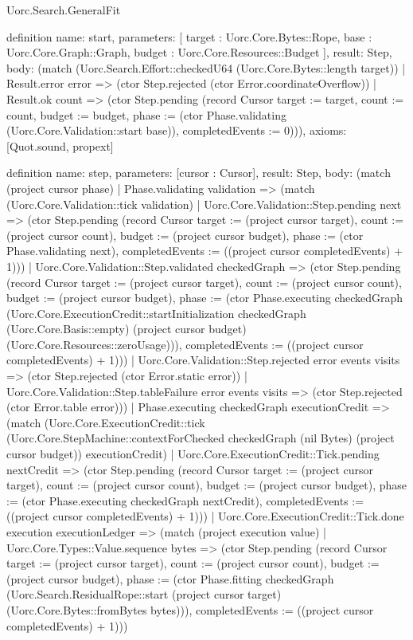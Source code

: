 \begin{lexlean}{Uorc.Search.GeneralFit}
\begin{semanticmodule}
definition{
  name: start,
  parameters: [
    target : Uorc.Core.Bytes::Rope,
    base : Uorc.Core.Graph::Graph,
    budget : Uorc.Core.Resources::Budget
  ],
  result: Step,
  body: (match (Uorc.Search.Effort::checkedU64 (Uorc.Core.Bytes::length target))
    | Result.error error => (ctor Step.rejected (ctor Error.coordinateOverflow))
    | Result.ok count => (ctor Step.pending (record Cursor {target := target, count := count, budget := budget, phase := (ctor Phase.validating (Uorc.Core.Validation::start base)), completedEvents := 0}))),
  axioms: [Quot.sound, propext]
}

definition{
  name: step,
  parameters: [cursor : Cursor],
  result: Step,
  body: (match (project cursor phase)
    | Phase.validating validation => (match (Uorc.Core.Validation::tick validation)
      | Uorc.Core.Validation::Step.pending next => (ctor Step.pending (record Cursor {target := (project cursor target), count := (project cursor count), budget := (project cursor budget), phase := (ctor Phase.validating next), completedEvents := ((project cursor completedEvents) + 1)}))
      | Uorc.Core.Validation::Step.validated checkedGraph => (ctor Step.pending (record Cursor {target := (project cursor target), count := (project cursor count), budget := (project cursor budget), phase := (ctor Phase.executing checkedGraph (Uorc.Core.ExecutionCredit::startInitialization checkedGraph (Uorc.Core.Basis::empty) (project cursor budget) (Uorc.Core.Resources::zeroUsage))), completedEvents := ((project cursor completedEvents) + 1)}))
      | Uorc.Core.Validation::Step.rejected error events visits => (ctor Step.rejected (ctor Error.static error))
      | Uorc.Core.Validation::Step.tableFailure error events visits => (ctor Step.rejected (ctor Error.table error)))
    | Phase.executing checkedGraph executionCredit => (match (Uorc.Core.ExecutionCredit::tick (Uorc.Core.StepMachine::contextForChecked checkedGraph (nil Bytes) (project cursor budget)) executionCredit)
      | Uorc.Core.ExecutionCredit::Tick.pending nextCredit => (ctor Step.pending (record Cursor {target := (project cursor target), count := (project cursor count), budget := (project cursor budget), phase := (ctor Phase.executing checkedGraph nextCredit), completedEvents := ((project cursor completedEvents) + 1)}))
      | Uorc.Core.ExecutionCredit::Tick.done execution executionLedger => (match (project execution value)
        | Uorc.Core.Types::Value.sequence bytes => (ctor Step.pending (record Cursor {target := (project cursor target), count := (project cursor count), budget := (project cursor budget), phase := (ctor Phase.fitting checkedGraph (Uorc.Search.ResidualRope::start (project cursor target) (Uorc.Core.Bytes::fromBytes bytes))), completedEvents := ((project cursor completedEvents) + 1)}))
}
\end{semanticmodule}
\end{lexlean}
